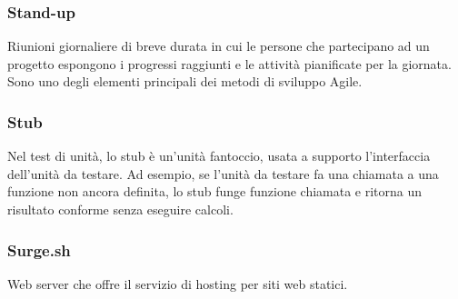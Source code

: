 \subsubsection*{Stand-up}
Riunioni giornaliere di breve durata in cui le persone che partecipano ad un progetto espongono i progressi raggiunti e le attività pianificate per la giornata. Sono uno degli elementi principali dei metodi di sviluppo Agile\glo. 

\subsubsection*{Stub}
Nel test di unità, lo stub è un'unità fantoccio, usata a supporto l'interfaccia dell'unità da testare. Ad esempio, se l'unità da testare fa una chiamata a una funzione non ancora definita, lo stub funge funzione chiamata e ritorna un risultato conforme senza eseguire calcoli.

\subsubsection*{Surge.sh}
Web server che offre il servizio di hosting per siti web statici.

